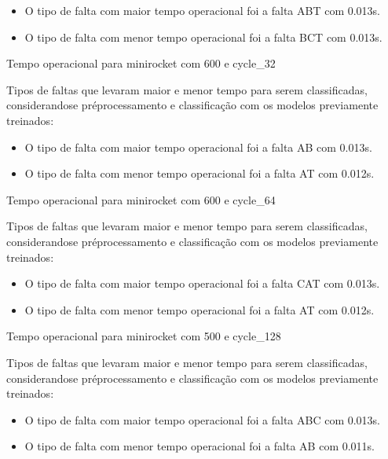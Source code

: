 \begin{itemize}
\item O tipo de falta com maior tempo operacional foi a falta ABT com 0.013s.
\item O tipo de falta com menor tempo operacional foi a falta BCT com 0.013s.
\end{itemize}
Tempo operacional para minirocket com 600 e cycle_32
\item Tipos de faltas que levaram maior e menor tempo para serem classificadas, considerando\hyph se pré\hyph processamento e classificação com os modelos previamente treinados:
\begin{itemize}
\item O tipo de falta com maior tempo operacional foi a falta AB com 0.013s.
\item O tipo de falta com menor tempo operacional foi a falta AT com 0.012s.
\end{itemize}
Tempo operacional para minirocket com 600 e cycle_64
\item Tipos de faltas que levaram maior e menor tempo para serem classificadas, considerando\hyph se pré\hyph processamento e classificação com os modelos previamente treinados:
\begin{itemize}
\item O tipo de falta com maior tempo operacional foi a falta CAT com 0.013s.
\item O tipo de falta com menor tempo operacional foi a falta AT com 0.012s.
\end{itemize}
Tempo operacional para minirocket com 500 e cycle_128
\item Tipos de faltas que levaram maior e menor tempo para serem classificadas, considerando\hyph se pré\hyph processamento e classificação com os modelos previamente treinados:
\begin{itemize}
\item O tipo de falta com maior tempo operacional foi a falta ABC com 0.013s.
\item O tipo de falta com menor tempo operacional foi a falta AB com 0.011s.
\end{itemize}
